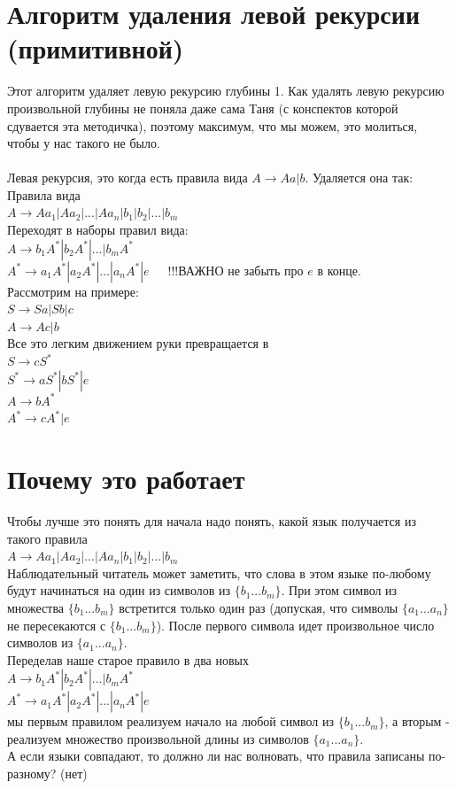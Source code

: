 \documentclass[14pt]{extreport}
\begin{document}
	\section{Алгоритм удаления левой рекурсии (примитивной)}
	Этот алгоритм удаляет левую рекурсию глубины 1. Как удалять левую рекурсию
	произвольной глубины не поняла даже сама Таня (с конспектов которой сдувается
	эта методичка), поэтому максимум, что мы можем, это молиться, чтобы у нас такого
	не было.\\\\
	Левая рекурсия, это когда есть правила вида $A \to Aa|b$. Удаляется она так:\\
	Правила вида\\
	$A \to Aa_1|Aa_2|...|Aa_n|b_1|b_2|...|b_m$\\
	Переходят в наборы правил вида:\\
	$A \to b_1A^*|b_2A^*|...|b_mA^*$\\
	$A^* \to a_1A^*|a_2A^*|...|a_nA^*|e$\ \ \ !!!ВАЖНО не забыть про $e$ в конце.\\
	Рассмотрим на примере:\\
	$S \to Sa|Sb|c $\\
	$A \to Ac|b $\\
	Все это легким движением руки превращается в\\
	$S \to cS^* $\\
	$S^* \to aS^*|bS^*|e $\\
	$A \to bA^* $\\
	$A^* \to cA^*|e $\\
	\section{Почему это работает}
	Чтобы лучше это понять для начала надо понять, какой язык получается из такого правила\\
	$A \to Aa_1|Aa_2|...|Aa_n|b_1|b_2|...|b_m$\\
	Наблюдательный читатель может заметить, что слова в этом языке по-любому будут
	начинаться на один из символов из $\{b_1...b_m\}$. При этом символ из множества
	$\{b_1...b_m\}$ встретится только один раз (допуская, что символы $\{a_1...a_n\}$
	не пересекаются с $\{b_1...b_m\}$). После первого символа идет произвольное число
	символов из $\{a_1...a_n\}$.\\
	Переделав наше старое правило в два новых\\
	$A \to b_1A^*|b_2A^*|...|b_mA^*$\\
	$A^* \to a_1A^*|a_2A^*|...|a_nA^*|e$\\
	мы первым правилом реализуем начало на любой символ из $\{b_1...b_m\}$, а вторым
	- реализуем множество произвольной длины из символов $\{a_1...a_n\}$.\\
	А если языки совпадают, то должно ли нас волновать, что правила записаны по-разному? (нет)
	
\end{document}
